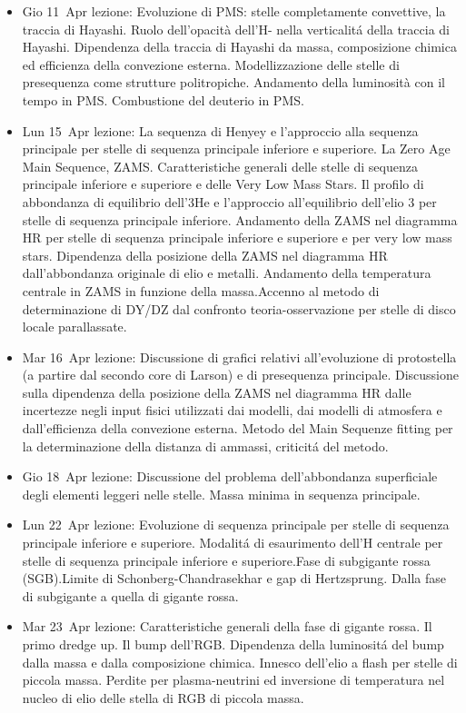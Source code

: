 \begin{itemize}
\item Gio 11 Apr lezione: Evoluzione di PMS: stelle completamente convettive, la traccia di Hayashi. Ruolo dell'opacità dell'H- nella verticalit\'a della traccia di Hayashi. Dipendenza della traccia di Hayashi da massa, composizione chimica ed efficienza della convezione esterna. Modellizzazione delle stelle di presequenza come strutture politropiche. Andamento della luminosità con il tempo in PMS. Combustione del deuterio in PMS. 
\item Lun 15 Apr lezione: La sequenza di Henyey e l'approccio alla sequenza principale per stelle di sequenza principale inferiore e superiore. La Zero Age Main Sequence, ZAMS. Caratteristiche generali delle stelle di sequenza principale inferiore e superiore e delle Very Low Mass Stars. Il profilo di abbondanza di equilibrio dell'3He e l'approccio all'equilibrio dell'elio 3 per stelle di sequenza principale inferiore. Andamento della ZAMS nel diagramma HR per stelle di sequenza principale inferiore e superiore e per very low mass stars. Dipendenza della posizione della ZAMS nel diagramma HR dall'abbondanza originale di elio e metalli. Andamento della temperatura centrale in ZAMS in funzione della massa.Accenno al metodo di determinazione di DY/DZ dal confronto teoria-osservazione per stelle di disco locale parallassate. 
\item Mar 16 Apr lezione: Discussione di grafici relativi all'evoluzione di protostella (a partire dal secondo core di Larson) e di presequenza principale. Discussione sulla dipendenza della posizione della ZAMS nel diagramma HR dalle incertezze negli input fisici utilizzati dai modelli, dai modelli di atmosfera e dall'efficienza della convezione esterna. Metodo del Main Sequenze fitting per la determinazione della distanza di ammassi, criticit\'a del metodo. 
\item Gio 18 Apr lezione: Discussione del problema dell'abbondanza superficiale degli elementi leggeri nelle stelle. Massa minima in sequenza principale. 
\item Lun 22 Apr lezione: Evoluzione di sequenza principale per stelle di sequenza principale inferiore e superiore. Modalit\'a di esaurimento dell'H centrale per stelle di sequenza principale inferiore e superiore.Fase di subgigante rossa (SGB).Limite di Schonberg-Chandrasekhar e gap di Hertzsprung. Dalla fase di subgigante a quella di gigante rossa. 
\item Mar 23 Apr lezione: Caratteristiche generali della fase di gigante rossa. Il primo dredge up. Il bump dell'RGB. Dipendenza della luminosit\'a del bump dalla massa e dalla composizione chimica. Innesco dell'elio a flash per stelle di piccola massa. Perdite per plasma-neutrini ed inversione di temperatura nel nucleo di elio delle stella di RGB di piccola massa. 

\end{itemize}
